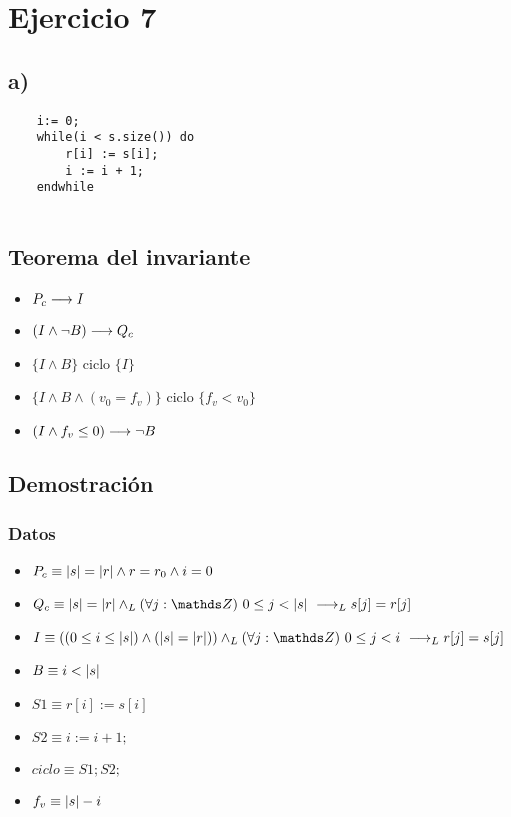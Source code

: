 \documentclass{article}
\begin{document}
\section*{Ejercicio 7}

\subsection*{a)}

\begin{verbatim}
    i:= 0;
    while(i < s.size()) do
        r[i] := s[i];
        i := i + 1;
    endwhile
    
\end{verbatim}
\subsection*{Teorema del invariante}
\begin{itemize}
    \item $P_{c} \longrightarrow I$
    \item $(I \wedge \neg B) \longrightarrow Q_{c}$
    \item $\{I \wedge B\}$ ciclo $\{ I \}$
    \item $\{I \wedge B \wedge (v_{0} = f_{v})\}$ ciclo $\{f_{v} < v_{0}\}$
    \item $(I \wedge f_{v} \leq 0) \longrightarrow \neg B$
\end{itemize}

\subsection*{Demostración}
\subsubsection*{Datos}
\begin{itemize}
    \item $P_{c}    \equiv |s| = |r| \wedge r = r_{0} \wedge i = 0$
    \item $Q_{c}    \equiv \longitud{s} = \longitud{r} \yLuego \paraTodo{j}{0}{\longitud{s}} \implicaLuego s[j] = r[j]$
    \item $I        \equiv ((0 \leq i \leq \longitud{s}) \wedge (\longitud{s} = \longitud{r})) \yLuego \paraTodo{j}{0}{i} \implicaLuego r[j] = s[j]$
    \item $B        \equiv i < |s|$
    \item $S1       \equiv r[i]:= s[i]$
    \item $S2       \equiv i:= i + 1;$
    \item $ciclo    \equiv S1;S2;$
    \item $f_{v}    \equiv |s|-i$
\end{itemize}
\end{document}
